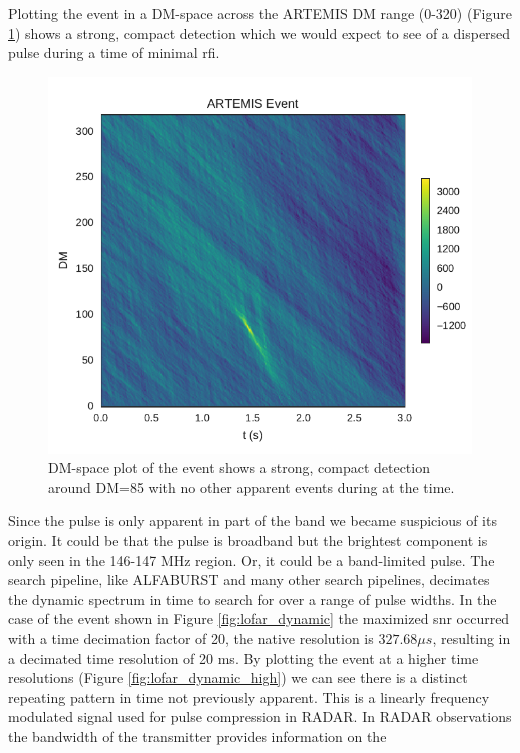 \documentclass[a4paper,fleqn,usenatbib]{mnras}
\begin{document}
Plotting the event in a DM-space across the ARTEMIS DM range (0-320) (Figure
\ref{fig:lofar_dm_time}) shows a strong, compact detection which we would expect
to see of a dispersed pulse during a time of minimal \gls{rfi}.
%
\begin{figure}
    \includegraphics[width=1.0\linewidth]{figures/LOFAR_dm_time.pdf}
    \caption{DM-space plot of the event shows a strong, compact detection around
    DM=85 with no other apparent events during at the time.
    }
    \label{fig:lofar_dm_time}
\end{figure}
%
Since the pulse is only apparent in part of the band we became suspicious of its
origin. It could be that the pulse is broadband but the brightest component is
only seen in the 146-147 MHz region. Or, it could be a band-limited pulse.  The
search pipeline, like ALFABURST and many other search pipelines, decimates the
dynamic spectrum in time to search for over a range of pulse widths. In the case
of the event shown in Figure \ref{fig:lofar_dynamic} the maximized \gls{snr}
occurred with a time decimation factor of 20, the native resolution is $327.68
\mu s$, resulting in a decimated time resolution of 20 ms. By plotting the event
at a higher time resolutions (Figure \ref{fig:lofar_dynamic_high}) we can see
there is a distinct repeating pattern in time not previously apparent. This is a
linearly frequency modulated signal used for pulse compression in RADAR. In
RADAR observations the bandwidth of the transmitter provides information on the
\end{document}
